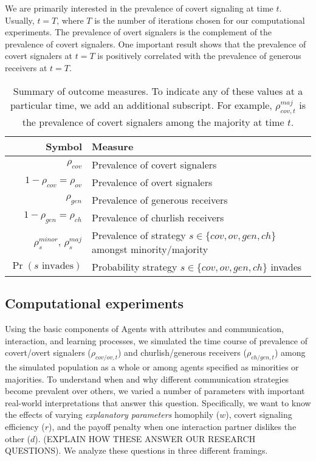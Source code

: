 \documentclass[11pt,letterpaper]{article}
\begin{document}
We are primarily interested in the prevalence of covert signaling at time
$t$. Usually, $t=T$, where $T$ is the number of iterations chosen for our 
computational experiments. The prevalence of overt signalers is the complement 
of the prevalence of covert signalers. One important result shows that the
prevalence of covert signalers at $t=T$ is positively correlated with the
prevalence of generous receivers at $t=T$.  

\begin{table}[H]
  \centering
  \begin{tabular}{rp{3in}} %
    Symbol & Measure \\ %
    \toprule
      $\rho_{cov}$ & Prevalence of covert signalers\\
    $1 - \rho_{cov} = \rho_{ov}$ & Prevalence of overt signalers  \\
     $\rho_{gen}$ & Prevalence of generous receivers \\
    $1 - \rho_{gen} = \rho_{ch}$ & Prevalence of churlish receivers \\
    $\rho_s^{minor}$, $\rho_s^{maj}$ & Prevalence of strategy $s \in \{cov, ov, gen, ch\}$ amongst minority/majority \\
    $\Pr(\text{$s$ invades})$ & Probability strategy $s \in \{cov, ov, gen, ch\}$ invades 
  \end{tabular}
  \caption{Summary of outcome measures. To indicate any of these values at
  a particular time, we add an additional subscript. For example, $\rho_{cov,t}^{maj}$
  is the prevalence of covert signalers among the majority at time $t$.}
  \label{tab:outcomeMeasures}
\end{table}


\subsection{Computational experiments}

Using the basic components of Agents with attributes and communication, interaction,
and learning processes, we simulated the time course of prevalence of 
covert/overt signalers ($\rho_{cov/ov,t}$) and churlish/generous receivers 
($\rho_{ch/gen,t}$) among the simulated
population as a whole or among agents specified as minorities or majorities.
To understand when and why different communication strategies become prevalent
over others, we varied a number of parameters with important real-world
interpretations that answer this question. Specifically, we want to know
the effects of varying \emph{explanatory parameters} 
homophily ($w$), covert signaling efficiency ($r$), and the
payoff penalty when one interaction partner dislikes the other ($d$). 
(EXPLAIN HOW THESE ANSWER OUR RESEARCH QUESTIONS). We analyze these questions
in three different framings. 
\end{document}
